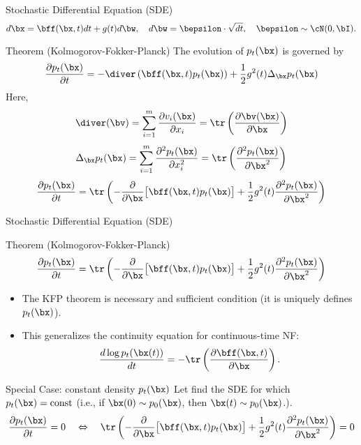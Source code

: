 \documentclass{beamer}
\begin{document}
\begin{frame}{Stochastic Differential Equation (SDE)}
	\vspace{-0.4cm}
	\[
		d\bx = \bff(\bx, t) dt + g(t) d \bw,\quad d \bw = \bepsilon \cdot \sqrt{dt},\quad \bepsilon \sim \cN(0, \bI).
	\]
	\vspace{-0.4cm}
	\begin{block}{Theorem (Kolmogorov-Fokker-Planck)}
		The evolution of $p_t(\bx)$ is governed by
		\vspace{-0.2cm}
		\[
			\frac{\partial p_t(\bx)}{\partial t} = - \diver\left(\bff(\bx, t) p_t(\bx)\right) + \frac{1}{2}g^2(t) \Delta_{\bx}p_t(\bx)
		\]
		\eqpause
		Here,
		\[
			\diver (\bv) = \sum_{i=1}^m \frac{\partial v_i(\bx)}{\partial x_i} = \tr\left( \frac{\partial \bv(\bx)}{\partial \bx}  \right)
		\]
		\[
			\Delta_{\bx}p_t(\bx) = \sum_{i=1}^m \frac{\partial^2 p_t(\bx)}{\partial x_i^2} = \tr\left( \frac{\partial^2 p_t(\bx)}{\partial \bx^2}  \right)
		\]
		\eqpause
		\[
			\frac{\partial p_t(\bx)}{\partial t} = \tr\left( - \frac{\partial}{\partial \bx} \bigl[ \bff(\bx, t) p_t(\bx)\bigr] + \frac{1}{2} g^2(t) \frac{\partial^2 p_t(\bx)}{\partial \bx^2} \right)
		\]
	\end{block}
\end{frame}
\begin{frame}{Stochastic Differential Equation (SDE)}
	\begin{block}{Theorem (Kolmogorov-Fokker-Planck)}
		\vspace{-0.2cm}
		\[
			\frac{\partial p_t(\bx)}{\partial t} = \tr\left( - \frac{\partial}{\partial \bx} \bigl[ \bff(\bx, t) p_t(\bx)\bigr] + \frac{1}{2} g^2(t) \frac{\partial^2 p_t(\bx)}{\partial \bx^2}\right)
		\]
		\vspace{-0.2cm}
	\end{block}
	\begin{itemize}
		\item The KFP theorem is necessary and sufficient condition (it is uniquely defines $p_t(\bx)$).
		\item This generalizes the continuity equation for continuous-time NF:
		\[
			\frac{d \log p_t(\bx(t))}{d t} = - \tr \left( \frac{\partial \bff(\bx, t)}{\partial \bx} \right).
		\]
	\end{itemize}
	\eqpause
	\vspace{-0.3cm}
	\begin{block}{Special Case: constant density $p_t(\bx)$}
		Let find the SDE for which $p_t(\bx) = \text{const}$ (i.e., if $\bx(0) \sim p_0(\bx)$, then $\bx(t) \sim p_0(\bx)$.).
		\eqpause
		\[
			\frac{\partial p_t(\bx)}{\partial t} = 0 \quad \Leftrightarrow \quad \tr\left( - \frac{\partial}{\partial \bx} \bigl[ \bff(\bx, t) p_t(\bx)\bigr] + \frac{1}{2} g^2(t) \frac{\partial^2 p_t(\bx)}{\partial \bx^2}\right) = 0
		\]
	\end{block}
\end{frame}
\end{document}
